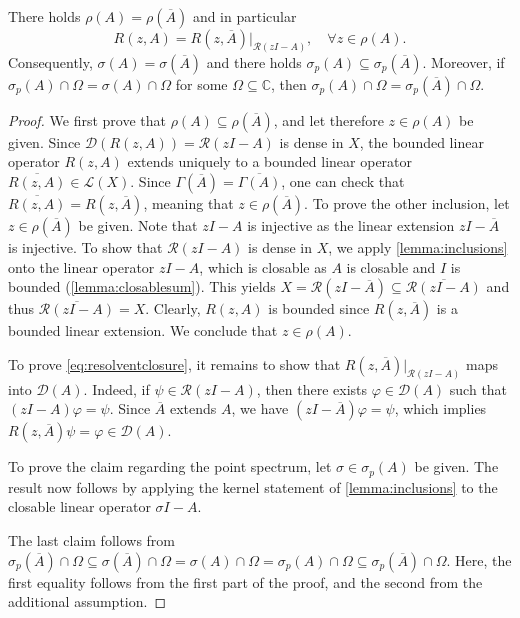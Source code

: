 \documentclass[english]{myarticle}
\begin{document}
\begin{sloppypar}
\begin{lemma} \label{lemma:spectraequalclosure}
There holds $\rho(A) = \rho(\overline{A})$ and in particular
\begin{equation} \label{eq:resolventclosure}
    R(z,A) = R(z,\overline{A})|_{\mathcal{R}(zI-A)}, \quad \forall z \in \rho(A).
\end{equation}
Consequently, $\sigma(A) = \sigma(\overline{A})$ and there holds $\sigma_p(A) \subseteq \sigma_p(\overline{A})$. Moreover, if $\sigma_p(A)\cap\Omega=\sigma(A)\cap\Omega$ for some $\Omega \subseteq \mathbb{C}$, then $\sigma_p(A) \cap \Omega = \sigma_p(\overline{A}) \cap \Omega$.
\end{lemma}
\begin{proof}
We first prove that $\rho(A) \subseteq \rho(\overline{A})$, and let therefore $z \in \rho(A)$ be given. Since $\mathcal{D}(R(z,A)) = \mathcal{R}(zI - A)$ is dense in $X$, the bounded linear operator $R(z,A)$ extends uniquely to a bounded linear operator $\overline{R(z,A)} \in \mathcal{L}(X)$. Since $\Gamma(\overline{A}) = \overline{\Gamma(A)}$, one can check that $\overline{R(z,A)} = R(z,\overline{A})$, meaning that $z \in \rho(\overline{A})$. To prove the other inclusion, let $z \in \rho(\overline{A})$ be given. Note that $zI-A$ is injective as the linear extension $zI-\overline{A}$ is injective. To show that $\mathcal{R}(zI-A)$ is dense in $X$, we apply \cref{lemma:inclusions} onto the linear operator $zI-A$, which is closable as $A$ is closable and $I$ is bounded (\cref{lemma:closablesum}). This yields $X = \mathcal{R}(zI-\overline{A}) \subseteq \overline{\mathcal{R}(zI-A)}$ and thus $\overline{\mathcal{R}(zI-A)} = X$. Clearly, $R(z,A)$ is bounded since $R(z,\overline{A})$ is a bounded linear extension. We conclude that $z \in \rho(A)$.

To prove \eqref{eq:resolventclosure}, it remains to show that $R(z,\overline{A})|_{\mathcal{R}(zI-A)}$ maps into $\mathcal{D}(A)$. Indeed, if $\psi \in \mathcal{R}(zI-A)$, then there exists $\varphi \in \mathcal{D}(A)$ such that $(zI-A)\varphi = \psi$. Since $\overline{A}$ extends $A$, we have $(zI-\overline{A})\varphi = \psi$, which implies $R(z,\overline{A})\psi = \varphi \in \mathcal{D}(A)$.

To prove the claim regarding the point spectrum, let $\sigma \in \sigma_p(A)$ be given. The result now follows by applying the kernel statement of \cref{lemma:inclusions} to the closable linear operator $\sigma I - A$.

The last claim follows from $\sigma_p(\overline{A}) \cap \Omega \subseteq \sigma(\overline{A}) \cap \Omega = \sigma(A) \cap \Omega = \sigma_p(A) \cap \Omega \subseteq \sigma_p(\overline{A}) \cap \Omega$. Here, the first equality follows from the first part of the proof, and the second from the additional assumption.
\end{proof}


\end{sloppypar}
\end{document}
